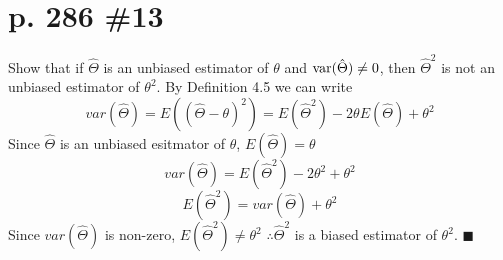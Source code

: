 \documentclass[12pt]{article}
\begin{document}
	\section[20pt]{p. 286 \#13}
	Show that if \(\hat{\Theta}\) is an unbiased estimator of \(\theta\) and \(\textup{var}(\hat{\Theta}) \neq 0\), then \(\hat{\Theta}^2\) is not an unbiased estimator of \(\theta^2\).
	\newline \newline
	By Definition 4.5 we can write
	\[var(\hat{\Theta})=E((\hat{\Theta}-\theta)^2)=E(\hat{\Theta}^2)-2\theta E(\hat{\Theta}) + \theta^2\]
	Since \(\hat{\Theta}\) is an unbiased esitmator of \(\theta\), \(E(\hat{\Theta})=\theta\)
	\[var(\hat{\Theta})=E(\hat{\Theta}^2)-2\theta^2 + \theta^2\]
	\[E(\hat{\Theta}^2)=var(\hat{\Theta}) + \theta^2\]
	Since \(var(\hat{\Theta})\) is non-zero, \(E(\hat{\Theta}^2) \neq \theta^2\) \newline \newline
	\(\therefore \hat{\Theta}^2\) is  a biased estimator of \(\theta^2\). \newline \(\blacksquare\)
\end{document}
